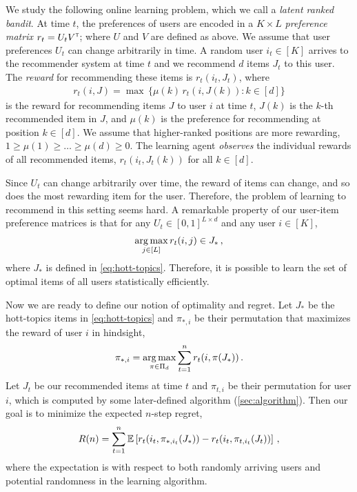 
We study the following online learning problem, which we call a \emph{latent ranked bandit}. At time $t$, the preferences of users are encoded in a $K \times L$ \emph{preference matrix} $r_t = U_t V^\mathsf{\scriptscriptstyle T}$; where $U$ and $V$ are defined as above. We assume that user preferences $U_t$ can change arbitrarily in time. A random user $i_t \in [K]$ arrives to the recommender system at time $t$ and we recommend $d$ items $J_t$ to this user. The \emph{reward} for recommending these items is $r_t(i_t, J_t)$, where
\begin{align}
  r_t(i, J) =
  \max \, \{\mu(k) \, r_t(i, J(k)): k \in [d]\}
  \label{eq:reward}
\end{align}
is the reward for recommending items $J$ to user $i$ at time $t$, $J(k)$ is the $k$-th recommended item in $J$, and $\mu(k)$ is the preference for recommending at position $k \in [d]$. We assume that higher-ranked positions are more rewarding, $1 \geq \mu(1) \geq \dots \geq \mu(d) \geq 0$. The learning agent \emph{observes} the individual rewards of all recommended items, $r_t(i_t, J_t(k))$ for all $k \in [d]$. 

Since $U_t$ can change arbitrarily over time, the reward of items can change, and so does the most rewarding item for the user. Therefore, the problem of learning to recommend in this setting seems hard. A remarkable property of our user-item preference matrices is that for any $U_t \in [0, 1]^{L \times d}$ and any user $i \in [K]$,
\begin{align*}
  \mathop{\rm arg\,max}_{j \in [L]} r_t(i, j) \in J_\ast\,,
\end{align*}
where $J_\ast$ is defined in \eqref{eq:hott-topics}. Therefore, it is possible to learn the set of optimal items of all users statistically efficiently.

Now we are ready to define our notion of optimality and regret. Let $J_\ast$ be the hott-topics items in \eqref{eq:hott-topics} and $\pi_{\ast, i}$ be their permutation that maximizes the reward of user $i$ in hindsight,
\begin{align*}
  \pi_{\ast, i} =
  \mathop{\rm arg\,max}_{\pi \in \Pi_d} \sum_{t = 1}^n r_t(i, \pi(J_\ast))\,.
\end{align*}
Let $J_t$ be our recommended items at time $t$ and $\pi_{t, i}$ be their permutation for user $i$, which is computed by some later-defined algorithm (\cref{sec:algorithm}). Then our goal is to minimize the expected $n$-step regret,
\begin{align}
  R(n) =
  \sum_{t = 1}^n \mathbb{E}\left[r_t(i_t, \pi_{\ast, i_t}(J_\ast)) - r_t(i_t, \pi_{t, i_t}(J_t))\right]\,,
  \label{eq:regret}
\end{align}
where the expectation is with respect to both randomly arriving users and potential randomness in the learning algorithm.
